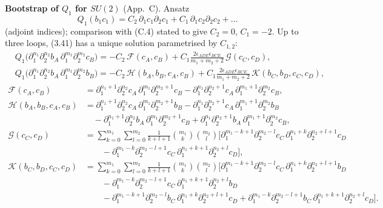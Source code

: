 \documentclass[11pt]{article}
\begin{document}
\textbf{Bootstrap of $Q_1$ for $SU(2)$} (App.~C). Ansatz
\begin{equation}
Q_1(b_1c_1)=C_2\,\partial_1c_1\partial_2c_1+C_1\,\partial_1c_2\partial_2c_2+\dots \tag{C.5}
\end{equation}
(adjoint indices); comparison with (C.4) stated to give $C_2=0$, $C_1=-2$. Up to three loops, (3.41) has a unique solution parametrised by $C_{1,2}$:
\begin{align}
&Q_1\big(\partial_1^{n_1}\partial_2^{n_2}b_A\,\partial_1^{m_1}\partial_2^{m_2}c_B\big)=-C_2\,\mathcal F(c_A,c_B)+C_1\frac{2\epsilon_{ADE}\epsilon_{BCE}}{m_1+m_2+2}\,\mathcal G(c_C,c_D), \tag{C.6}\\
&Q_1\big(\partial_1^{n_1}\partial_2^{n_2}b_A\,\partial_1^{m_1}\partial_2^{m_2}b_B\big)=-C_2\,\mathcal H(b_A,b_B,c_A,c_B)+C_1\frac{2\epsilon_{ADE}\epsilon_{BCE}}{m_1+m_2+2}\,\mathcal K(b_C,b_D,c_C,c_D), \tag{C.7}
\end{align}
\begin{align*}
\mathcal F(c_A,c_B)&=\partial_1^{n_1+1}\partial_2^{n_2}c_A\,\partial_1^{m_1}\partial_2^{m_2+1}c_B-\partial_1^{n_1}\partial_2^{n_2+1}c_A\,\partial_1^{m_1+1}\partial_2^{m_2}c_B,\\
\mathcal H(b_A,b_B,c_A,c_B)&=\partial_1^{n_1+1}\partial_2^{n_2}c_A\,\partial_1^{m_1}\partial_2^{m_2+1}b_B-\partial_1^{n_1}\partial_2^{n_2+1}c_A\,\partial_1^{m_1+1}\partial_2^{m_2}b_B\\
&\quad-\partial_1^{n_1+1}\partial_2^{n_2}b_A\,\partial_1^{m_1}\partial_2^{m_2+1}c_B+\partial_1^{n_1}\partial_2^{n_2+1}b_A\,\partial_1^{m_1+1}\partial_2^{m_2}c_B,\\
\mathcal G(c_C,c_D)&=\sum_{k=0}^{m_1}\sum_{l=0}^{m_2}\frac1{k+l+1}\binom{m_1}{k}\binom{m_2}{l}\Big[\partial_1^{m_1-k+1}\partial_2^{m_2-l}c_C\,\partial_1^{n_1+k}\partial_2^{n_2+l+1}c_D\\
&\qquad-\partial_1^{m_1-k}\partial_2^{m_2-l+1}c_C\,\partial_1^{n_1+k+1}\partial_2^{n_2+l}c_D\Big],\\
\mathcal K(b_C,b_D,c_C,c_D)&=\sum_{k=0}^{m_1}\sum_{l=0}^{m_2}\frac1{k+l+1}\binom{m_1}{k}\binom{m_2}{l}\Big[\partial_1^{m_1-k+1}\partial_2^{m_2-l}c_C\,\partial_1^{n_1+k}\partial_2^{n_2+l+1}b_D\\
&\qquad-\partial_1^{m_1-k}\partial_2^{m_2-l+1}c_C\,\partial_1^{n_1+k+1}\partial_2^{n_2+l}b_D\\
&\qquad-\partial_1^{m_1-k+1}\partial_2^{m_2-l}b_C\,\partial_1^{n_1+k}\partial_2^{n_2+l+1}c_D+\partial_1^{m_1-k}\partial_2^{m_2-l+1}b_C\,\partial_1^{n_1+k+1}\partial_2^{n_2+l}c_D\Big].
\end{align*}
\end{document}
